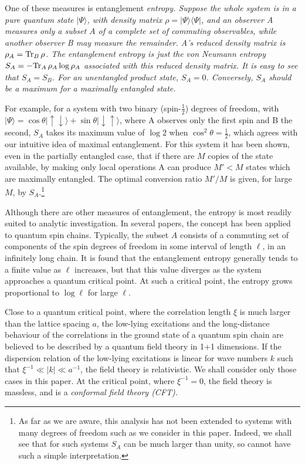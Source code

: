 \documentclass[preprint,aps]{revtex4}
\begin{document}
One of these measures\cite{Bennett}
is entanglement \em entropy\em. Suppose the whole
system is in a pure quantum state $|\Psi\rangle$, with density matrix
$\rho=|\Psi\rangle\langle\Psi|$, and an observer A measures only a
subset $A$ of a complete set of commuting observables, while another
observer B may measure the remainder. A's reduced density matrix is
$\rho_A={\rm Tr}_B\,\rho$. The entanglement entropy is just the von
Neumann entropy $S_A=-{\rm Tr}_A\,\rho_A\log\rho_A$ associated with this
reduced density matrix. It is easy to see that $S_A=S_B$. For an
unentangled product state, $S_A=0$. Conversely, $S_A$ should be a
maximum for a maximally entangled state.

For example, for a system with
two binary (spin-$\frac12$) degrees of freedom, with
$|\Psi\rangle=\cos\theta|\uparrow\downarrow\rangle+\sin\theta|\downarrow
\uparrow\rangle$, where A observes only the first spin and B the second,
$S_A$ takes its maximum value of $\log 2$ when $\cos^2\theta=\frac12$, which
agrees with our intuitive idea of maximal entanglement.
For this system it has been shown,\cite{Bennett} even in the partially
entangled case, that if there are $M$
copies of the state available, by making only local operations A can
produce $M'<M$ states which are maximally entangled. The optimal
conversion ratio $M'/M$ is given, for large $M$, by $S_A$.\footnote{As
far as we are aware, this analysis has not been extended to systems with
many degrees of freedom such as we consider in this paper. Indeed, we
shall see that for such systems $S_A$ can be much larger than unity, so
cannot have such a simple interpretation.}

Although there are other measures of entanglement,\cite{othermeasures}
the entropy is most readily suited to analytic investigation.
In several papers\cite{Vidal,Korepin,leb,Casini},
the concept has been applied to quantum spin chains.
Typically, the subset $A$ consists of a commuting set of components of
the spin degrees of freedom in some interval of length $\ell$, in an
infinitely long chain. It is found that the entanglement entropy
generally tends to a finite value as $\ell$ increases, but that this
value diverges as the system approaches a quantum critical point.
At such a critical point, the entropy grows proportional to $\log\ell$
for large $\ell$.

Close to a quantum critical point, where the correlation length $\xi$ is
much larger than the lattice spacing $a$, the low-lying excitations and
the long-distance behaviour of the correlations in the ground state of
a quantum spin chain are believed to be described by a quantum field
theory in 1+1 dimensions.
If the dispersion relation of the low-lying excitations is linear for
wave numbers $k$ such that $\xi^{-1}\ll|k|\ll a^{-1}$, the field theory
is relativistic. We shall consider only those cases in this paper.
At the critical point, where $\xi^{-1}=0$, the field theory is massless,
and is a \em conformal \em field theory (CFT).
\end{document}
